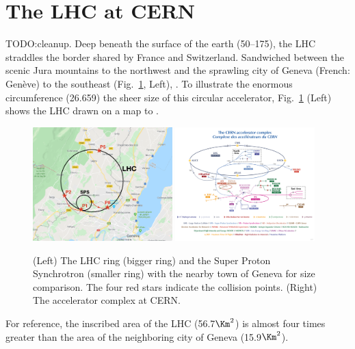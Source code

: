 \section{The LHC at CERN}
TODO:cleanup.
Deep beneath the surface of the earth (50--175\meter), the LHC straddles the border shared by France and Switzerland.
Sandwiched between the scenic Jura mountains to the northwest and the sprawling city of Geneva (French: Genève) to the southeast (Fig.~\ref{fig:lhc_on_map_and_complex}, Left), .
To illustrate the enormous circumference (26.659\Km) the sheer size of this circular accelerator, Fig.~\ref{fig:lhc_on_map_and_complex} (Left) shows the LHC drawn on a map to .
\begin{figure}[pbth]
    \centering
    \includegraphics[width=0.48\textwidth,keepaspectratio]{figures/lhc/lhc_drawn_on_map_withpoints.png}
    \includegraphics[width=0.48\textwidth,keepaspectratio]{figures/lhc/cern_complex.png}
        \caption{
        (Left) The LHC ring (bigger ring) and the Super Proton Synchrotron (smaller ring) with the nearby town of Geneva for size comparison. 
        The four red stars indicate the \pp collision points. 
        (Right) The accelerator complex at CERN.
        } 
        \label{fig:lhc_on_map_and_complex}
    \end{figure}
For reference, the inscribed area of the LHC (56.7$\Km^{2}$) is almost four times greater than the area of the neighboring city of Geneva (15.9$\Km^{2}$).

